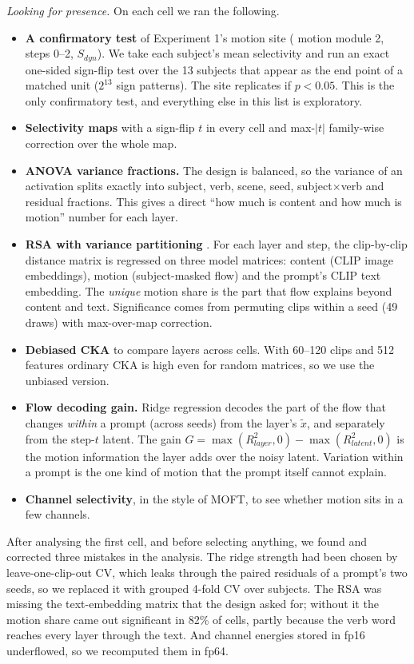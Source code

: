 \documentclass[twoside,english]{article}
\newcommand{\xd}{\tilde{x}}       %
\begin{document}
\emph{Looking for presence.} On each cell we ran the following.
\begin{itemize}
\item \textbf{A confirmatory test} of Experiment 1's motion site ( motion module 2,
  steps 0--2, $S_{dyn}$). We take each subject's mean selectivity and run an exact one-sided sign-flip test
  over the 13 subjects that appear as the end point of a matched unit ($2^{13}$ sign patterns). The site
  replicates if $p < 0.05$. This is the only confirmatory test, and everything else in this list is
  exploratory.
\item \textbf{Selectivity maps} with a sign-flip $t$ in every cell and max-$|t|$ family-wise correction
  over the whole map.
\item \textbf{ANOVA variance fractions.} The design is balanced, so the variance of an activation splits
  exactly into subject, verb, scene, seed, subject$\times$verb and residual fractions. This gives a direct
  ``how much is content and how much is motion'' number for each layer.
\item \textbf{RSA with variance partitioning} \citep{kriegeskorte2008rsa}. For each layer and step, the
  clip-by-clip distance matrix is regressed on three model matrices: content (CLIP image embeddings),
  motion (subject-masked flow) and the prompt's CLIP text embedding. The \emph{unique} motion share is
  the part that flow explains beyond content and text. Significance comes from permuting clips within a
  seed (49 draws) with max-over-map correction.
\item \textbf{Debiased CKA} \citep{kornblith2019cka} to compare layers across cells. With 60--120 clips and
  512 features ordinary CKA is high even for random matrices, so we use the unbiased version.
\item \textbf{Flow decoding gain.} Ridge regression decodes the part of the flow that changes
  \emph{within} a prompt (across seeds) from the layer's $\xd$, and separately from the step-$t$ latent.
  The gain $G = \max(R^2_{layer},0) - \max(R^2_{latent},0)$ is the motion information the layer adds over
  the noisy latent. Variation within a prompt is the one kind of motion that the prompt itself cannot
  explain.
\item \textbf{Channel selectivity}, in the style of MOFT, to see whether motion sits in a few channels.
\end{itemize}
After analysing the first cell, and before selecting anything, we found and corrected three mistakes in
the analysis. The ridge strength had been chosen by leave-one-clip-out CV, which leaks through the paired
residuals of a prompt's two seeds, so we replaced it with grouped 4-fold CV over subjects. The RSA was
missing the text-embedding matrix that the design asked for; without it the motion share came out
significant in 82\% of cells, partly because the verb word reaches every layer through the text. And
channel energies stored in fp16 underflowed, so we recomputed them in fp64.
\end{document}
